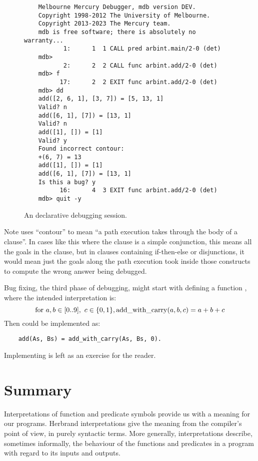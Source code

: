 \begin{figure}[hb]
\begin{verbatim}
    Melbourne Mercury Debugger, mdb version DEV.
    Copyright 1998-2012 The University of Melbourne.
    Copyright 2013-2023 The Mercury team.
    mdb is free software; there is absolutely no warranty...
           1:      1  1 CALL pred arbint.main/2-0 (det)
    mdb>
           2:      2  2 CALL func arbint.add/2-0 (det)
    mdb> f
          17:      2  2 EXIT func arbint.add/2-0 (det)
    mdb> dd
    add([2, 6, 1], [3, 7]) = [5, 13, 1]
    Valid? n
    add([6, 1], [7]) = [13, 1]
    Valid? n
    add([1], []) = [1]
    Valid? y
    Found incorrect contour:
    +(6, 7) = 13
    add([1], []) = [1]
    add([6, 1], [7]) = [13, 1]
    Is this a bug? y
          16:      4  3 EXIT func arbint.add/2-0 (det)
    mdb> quit -y
\end{verbatim}
\caption{
An  declarative debugging session.
\label{fig:dd-session}}
\end{figure}

Note  uses ``contour'' to mean
``a path execution takes through the body of a clause''.
In cases like this where the clause is a simple conjunction,
this means all the goals in the clause,
but in clauses containing if-then-else or disjunctions,
it would mean just the goals along the path execution took
inside those constructs to compute the wrong answer being debugged.

\label{end:decl-debug}

Bug fixing,
the third phase of debugging,
might start with defining a function ,
where the intended interpretation is:
\[
    \text{for }a, b \in [0..9],\ c \in \{0, 1\},
        \operatorname{add\_with\_carry}(a, b, c) = a + b + c
\]
Then  could be implemented as:
\begin{verbatim}
    add(As, Bs) = add_with_carry(As, Bs, 0).
\end{verbatim}
Implementing 
is left as an exercise for the reader.


\section{Summary}

Interpretations of function and predicate symbols
provide us with a meaning for our programs.
Herbrand interpretations give the meaning
from the compiler's point of view,
in purely syntactic terms.
More generally, interpretations describe,
sometimes informally,
the behaviour of the functions and predicates in a program
with regard to its inputs and outputs.

